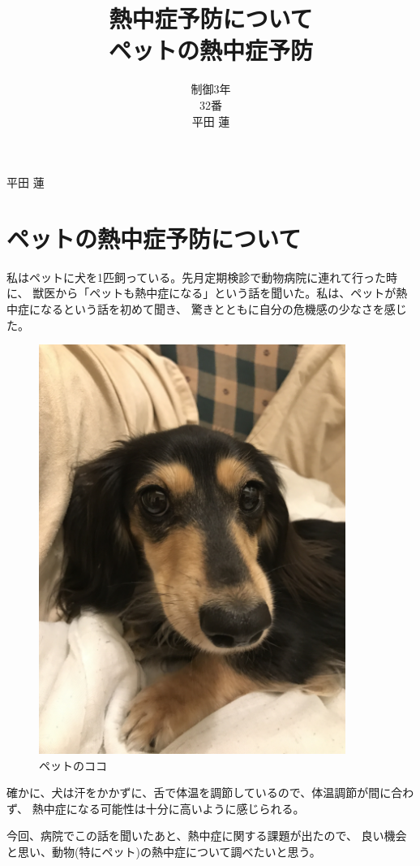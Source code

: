 \documentclass[titlepage]{jsarticle}
\title{
  熱中症予防について \\
  \large ペットの熱中症予防
}
\date{}
\author{
  制御3年 \\
  32番 \\
  平田 蓮
}
\begin{document}
  \maketitle
  \begin{flushright}
    平田 蓮
  \end{flushright}
  \section{ペットの熱中症予防について}
    私はペットに犬を1匹飼っている。先月定期検診で動物病院に連れて行った時に、
    獣医から「ペットも熱中症になる」という話を聞いた。私は、ペットが熱中症になるという話を初めて聞き、
    驚きとともに自分の危機感の少なさを感じた。

    \begin{figure}[h]
      \begin{center}
        \includegraphics[width=10cm, angle=270]{koko.jpg}
        \caption{ペットのココ}
      \end{center}
    \end{figure}

    確かに、犬は汗をかかずに、舌で体温を調節しているので、体温調節が間に合わず、
    熱中症になる可能性は十分に高いように感じられる。

    今回、病院でこの話を聞いたあと、熱中症に関する課題が出たので、
    良い機会と思い、動物(特にペット)の熱中症について調べたいと思う。
\end{document}
